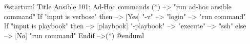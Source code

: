 @startuml
Title Ansible 101: Ad-Hoc commands
(*)  --> "run ad-hoc ansible command"
If "input is verbose" then
--> [Yes] "-v"
--> "login"
--> "run command"
If "input is playbook" then
--> [playbook] "-playbook"
--> "execute"
--> "ssh"
else
--> [No] "run command"
Endif
-->(*)
@enduml
